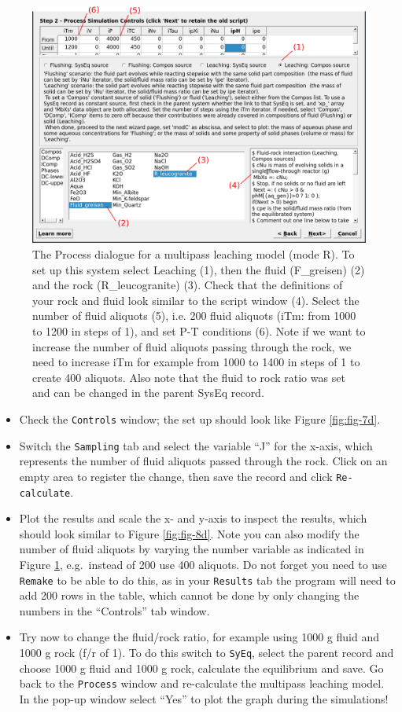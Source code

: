 \documentclass[
]{book}
\begin{document}
\begin{figure}
\includegraphics[width=1\linewidth]{figures/module4/fig-6} \caption{The Process dialogue for a multipass leaching model (mode R). To set up this system select Leaching (1), then the fluid (F\_greisen) (2) and the rock (R\_leucogranite) (3). Check that the definitions of your rock and fluid look similar to the script window (4). Select the number of fluid aliquots (5), i.e. 200 fluid aliquots (iTm: from 1000 to 1200 in steps of 1), and set P-T conditions (6). Note if we want to increase the number of fluid aliquots passing through the rock, we need to increase iTm for example from 1000 to 1400 in steps of 1 to create 400 aliquots. Also note that the fluid to rock ratio was set and can be changed in the parent SysEq record.}\label{fig:fig-6d}
\end{figure}

\begin{itemize}
\item
  Check the \texttt{Controls} window; the set up should look like Figure \ref{fig:fig-7d}.
\item
  Switch the \texttt{Sampling} tab and select the variable ``J'' for the x-axis, which represents the number of fluid aliquots passed through the rock. Click on an empty area to register the change, then save the record and click \texttt{Re-calculate}.
\item
  Plot the results and scale the x- and y-axis to inspect the results, which should look similar to Figure \ref{fig:fig-8d}. Note you can also modify the number of fluid aliquots by varying the number variable as indicated in Figure \ref{fig:fig-6d}, e.g.~instead of 200 use 400 aliquots. Do not forget you need to use \texttt{Remake} to be able to do this, as in your \texttt{Results} tab the program will need to add 200 rows in the table, which cannot be done by only changing the numbers in the ``Controls'' tab window.
\item
  Try now to change the fluid/rock ratio, for example using 1000 g fluid and 1000 g rock (f/r of 1). To do this switch to \texttt{SyEq}, select the parent record and choose 1000 g fluid and 1000 g rock, calculate the equilibrium and save. Go back to the \texttt{Process} window and re-calculate the multipass leaching model. In the pop-up window select ``Yes'' to plot the graph during the simulations!
\end{itemize}
\end{document}
